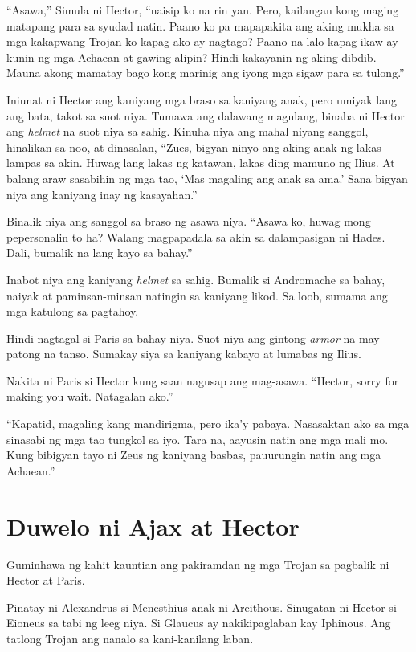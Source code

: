 \documentclass[12pt,letterpaper]{report}
\begin{document}
``Asawa,'' Simula ni Hector, ``naisip ko na rin yan. Pero, kailangan kong maging matapang para sa syudad natin. Paano ko pa mapapakita ang aking mukha sa mga kakapwang Trojan ko kapag ako ay nagtago? Paano na lalo kapag ikaw ay kunin ng mga Achaean at gawing alipin? Hindi kakayanin ng aking dibdib. Mauna akong mamatay bago kong marinig ang iyong mga sigaw para sa tulong.''

Iniunat ni Hector ang kaniyang mga braso sa kaniyang anak, pero umiyak lang ang bata, takot sa suot niya. Tumawa ang dalawang magulang, binaba ni Hector ang \textit{helmet} na suot niya sa sahig. Kinuha niya ang mahal niyang sanggol, hinalikan sa noo, at dinasalan, ``Zues, bigyan ninyo ang aking anak ng lakas lampas sa akin. Huwag lang lakas ng katawan, lakas ding mamuno ng Ilius. At balang araw sasabihin ng mga tao, `Mas magaling ang anak sa ama.' Sana bigyan niya ang kaniyang inay ng kasayahan.''

Binalik niya ang sanggol sa braso ng asawa niya. ``Asawa ko, huwag mong pepersonalin to ha? Walang magpapadala sa akin sa dalampasigan ni Hades. Dali, bumalik na lang kayo sa bahay.''

Inabot niya ang kaniyang \textit{helmet} sa sahig. Bumalik si Andromache sa bahay, naiyak at paminsan-minsan natingin sa kaniyang likod. Sa loob, sumama ang mga katulong sa pagtahoy.

Hindi nagtagal si Paris sa bahay niya. Suot niya ang gintong \textit{armor} na may patong na tanso. Sumakay siya sa kaniyang kabayo at lumabas ng Ilius.

Nakita ni Paris si Hector kung saan nagusap ang mag-asawa. ``Hector, sorry for making you wait. Natagalan ako.''

``Kapatid, magaling kang mandirigma, pero ika'y pabaya. Nasasaktan ako sa mga sinasabi ng mga tao tungkol sa iyo. Tara na, aayusin natin ang mga mali mo. Kung bibigyan tayo ni Zeus ng kaniyang basbas, pauurungin natin ang mga Achaean.''

\pagebreak
\chapter{Duwelo ni Ajax at Hector}

Guminhawa ng kahit kauntian ang pakiramdan ng mga Trojan sa pagbalik ni Hector at Paris.

Pinatay ni Alexandrus si Menesthius anak ni Areithous. Sinugatan ni Hector si Eioneus sa tabi ng leeg niya. Si Glaucus ay nakikipaglaban kay Iphinous. Ang tatlong Trojan ang nanalo sa kani-kanilang laban.
\end{document}
